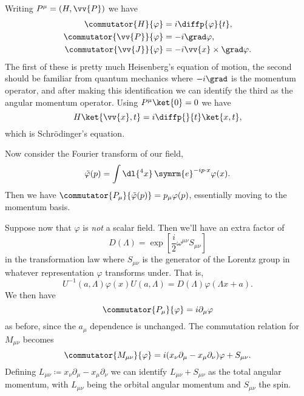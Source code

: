 \documentclass[fleqn]{NotesClass}
\newcommand{\e}{\symrm{e}}
\begin{document}
    Writing \(P^\mu = (H, \vv{P})\) we have
    \begin{align}
        \commutator{H}{\varphi} &= i\diffp{\varphi}{t},\\
        \commutator{\vv{P}}{\varphi} &= -i\grad \varphi,\\
        \commutator{\vv{J}}{\varphi} &= -i\vv{x} \times \grad\varphi.
    \end{align}
    The first of these is pretty much Heisenberg's equation of motion, the second should be familiar from quantum mechanics where \(-i\grad\) is the momentum operator, and after making this identification we can identify the third as the angular momentum operator.
    Using \(P^\mu\ket{0} = 0\) we have
    \begin{equation}
        H\ket{\vv{x}, t} = i\diffp{}{t} \ket{x, t},
    \end{equation}
    which is Schrödinger's equation.
    
    Now consider the Fourier transform of our field,
    \begin{equation}
        \tilde{\varphi}(p) = \int \dl{^4x} \, \e^{-ip\cdot x} \varphi(x).
    \end{equation}
    Then we have \(\commutator{P_\mu}{\tilde{\varphi}(p)} = p_\mu\varphi(p)\), essentially moving to the momentum basis.
    
    Suppose now that \(\varphi\) is \emph{not} a scalar field.
    Then we'll have an extra factor of 
    \begin{equation}
        D(\Lambda) = \exp\left[ \frac{i}{2}\omega^{\mu\nu}S_{\mu\nu} \right]
    \end{equation}
    in the transformation law where \(S_{\mu\nu}\) is the generator of the Lorentz group in whatever representation \(\varphi\) transforms under.
    That is,
    \begin{equation}
        U^{-1}(a, \Lambda) \varphi(x) U(a, \Lambda) = D(\Lambda)\varphi(\Lambda x + a).
    \end{equation}
    We then have
    \begin{equation}
        \commutator{P_\mu}{\varphi} = i\partial_\mu \varphi
    \end{equation}
    as before, since the \(a_\mu\) dependence is unchanged.
    The commutation relation for \(M_{\mu\nu}\) becomes
    \begin{equation}
        \commutator{M_{\mu\nu}}{\varphi} = i(x_\nu \partial_\mu - x_\mu \partial_\nu)\varphi + S_{\mu\nu}.
    \end{equation}
    Defining \(L_{\mu\nu} \coloneqq x_\nu \partial_\mu - x_\mu \partial_\nu\) we can identify \(L_{\mu\nu} + S_{\mu\nu}\) as the total angular momentum, with \(L_{\mu\nu}\) being the orbital angular momentum and \(S_{\mu\nu}\) the spin.
    
\end{document}
